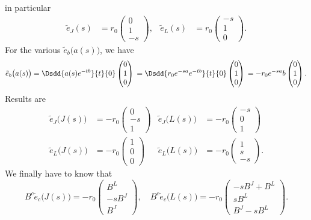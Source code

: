 in particular
 \begin{align}
\tilde{e}_J(s)&=r_0\begin{pmatrix}
0\\1\\-s
\end{pmatrix},
&\tilde{e}_L(s)&=r_0\begin{pmatrix}
-s\\1\\0
\end{pmatrix}.
\end{align} 
For the various $\tilde{e}_b\big( a(s) \big)$, we have
\begin{equation}
\tilde{e}_b\big( a(s) \big)=\Dsdd{ a(s) e^{-tb} }{t}{0}\begin{pmatrix}
0\\1\\0
\end{pmatrix}\\
    =\Dsdd{ r_0 e^{-sa} e^{-tb} }{t}{0}\begin{pmatrix}
0\\1\\0
\end{pmatrix}\\
    =-r_0 e^{-sa}b\begin{pmatrix}
0\\1\\0
\end{pmatrix}.
\end{equation}
Results are
\begin{subequations}
\begin{align}
  \tilde{e}_J\big( J(s) \big)&=-r_0\begin{pmatrix}
0\\-s\\1
\end{pmatrix}
&
\tilde{e}_J\big( L(s) \big)&=-r_0\begin{pmatrix}
-s\\0\\1
\end{pmatrix}\\
\tilde{e}_L\big( J(s) \big)&=-r_0\begin{pmatrix}
1\\0\\0
\end{pmatrix}
&
\tilde{e}_L\big( L(s) \big)&=-r_0\begin{pmatrix}
1\\s\\-s
\end{pmatrix}.
\end{align}
\end{subequations}
We finally have to know that
\[ 
  B^c\tilde{e}_c\big( J(s) \big)=-r_0\begin{pmatrix}
B^L\\-sB^J\\B^J
\end{pmatrix},
\quad
B^c\tilde{e}_c\big( L(s) \big)=-r_0\begin{pmatrix}
-sB^J+B^L\\sB^L\\B^J-sB^L
\end{pmatrix}.
\]

